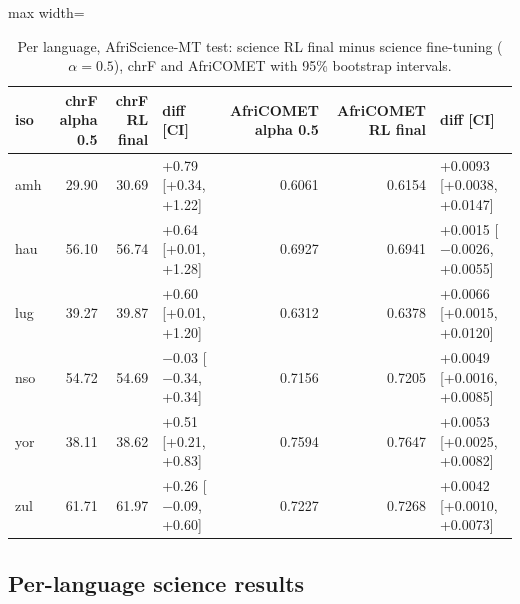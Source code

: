 \begin{table}[t]
\centering\footnotesize
\setlength{\tabcolsep}{4pt}
\caption{Per language, AfriScience-MT test: science RL final minus science fine-tuning ($\alpha=0.5$), chrF and AfriCOMET with 95\% bootstrap intervals.}\label{tab:sci-s3}
\begin{adjustbox}{max width=\linewidth}\begin{tabular}{@{}lrrlrrl@{}}
\toprule
iso & chrF alpha 0.5 & chrF RL final & diff [CI] & AfriCOMET alpha 0.5 & AfriCOMET RL final & diff [CI] \\
\midrule
amh & 29.90 & 30.69 & +0.79 [+0.34, +1.22] & 0.6061 & 0.6154 & +0.0093 [+0.0038, +0.0147] \\
hau & 56.10 & 56.74 & +0.64 [+0.01, +1.28] & 0.6927 & 0.6941 & +0.0015 [\ensuremath{-}0.0026, +0.0055] \\
lug & 39.27 & 39.87 & +0.60 [+0.01, +1.20] & 0.6312 & 0.6378 & +0.0066 [+0.0015, +0.0120] \\
nso & 54.72 & 54.69 & \ensuremath{-}0.03 [\ensuremath{-}0.34, +0.34] & 0.7156 & 0.7205 & +0.0049 [+0.0016, +0.0085] \\
yor & 38.11 & 38.62 & +0.51 [+0.21, +0.83] & 0.7594 & 0.7647 & +0.0053 [+0.0025, +0.0082] \\
zul & 61.71 & 61.97 & +0.26 [\ensuremath{-}0.09, +0.60] & 0.7227 & 0.7268 & +0.0042 [+0.0010, +0.0073] \\
\bottomrule
\end{tabular}\end{adjustbox}
\end{table}

\subsection*{Per-language science results}













